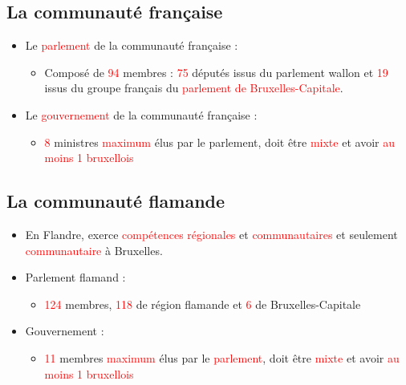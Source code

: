 \subsection{La communauté française}
\begin{itemize}
	\item Le \textcolor{red}{parlement} de la communauté française :
	\begin{itemize}
		\item Composé de \textcolor{red}{94} membres : \textcolor{red}{75} députés issus du parlement wallon et \textcolor{red}{19} issus du groupe français du \textcolor{red}{parlement de Bruxelles-Capitale}.
	\end{itemize}
	\item Le \textcolor{red}{gouvernement} de la communauté française :
	\begin{itemize}
		\item \textcolor{red}{8} ministres \textcolor{red}{maximum} élus par le parlement, doit être \textcolor{red}{mixte} et avoir \textcolor{red}{au moins 1 bruxellois}
	\end{itemize}
\end{itemize}

\subsection{La communauté flamande}
\begin{itemize}
	\item En Flandre, exerce \textcolor{red}{compétences régionales} et \textcolor{red}{communautaires} et seulement \textcolor{red}{communautaire} à Bruxelles.
	\item Parlement flamand :
	\begin{itemize}
		\item \textcolor{red}{124} membres, \textcolor{red}{118} de région flamande et \textcolor{red}{6} de Bruxelles-Capitale
	\end{itemize}
	\item Gouvernement :
	\begin{itemize}
		\item \textcolor{red}{11} membres \textcolor{red}{maximum} élus par le \textcolor{red}{parlement}, doit être \textcolor{red}{mixte} et avoir \textcolor{red}{au moins 1 bruxellois}
	\end{itemize}
\end{itemize}

